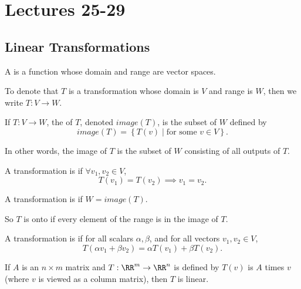 \section{Lectures 25-29}
\subsection{Linear Transformations}
\begin{definition}
  A  is a function whose domain and range are vector spaces.
\end{definition}

To denote that $T$ is a transformation whose domain is $V$ and range is $W$, then we write $T : V \to W$.

\begin{definition}
  If $T : V \to W$, the  of $T$, denoted $image(T)$, is the subset of $W$ defined by
  \begin{equation*}
    image(T) = \left\{T(v) \mid \text{for some } v \in V\right\}.
  \end{equation*}

  In other words, the image of $T$ is the subset of $W$ consisting of all outputs of $T$.
\end{definition}

\begin{definition}[injectivity]
  A transformation is  if $\forall v_{1}, v_{2} \in V$,
  \begin{equation*}
    T(v_{1}) = T(v_{2}) \implies v_{1} = v_{2}.
  \end{equation*}
\end{definition}

\begin{definition}[surjectivity]
  A transformation is  if $W = image(T)$. 

  So $T$ is onto if every element of the range is in the image of $T$.
\end{definition}

\begin{definition}
  A transformation is  if for all scalars $\alpha, \beta$, and for all vectors $v_{1}, v_{2} \in V$,
  \begin{equation*}
    T(\alpha v_{1} + \beta v_{2}) = \alpha T(v_{1}) + \beta T(v_{2}).
  \end{equation*}
\end{definition}

\begin{theorem}
  If $A$ is an $n \times m$ matrix and $T : \RR^{m} \to \RR^{n}$ is defined by $T(v)$ is $A$ times $v$ (where $v$ is viewed as a column matrix), then $T$ is linear.
\end{theorem}

